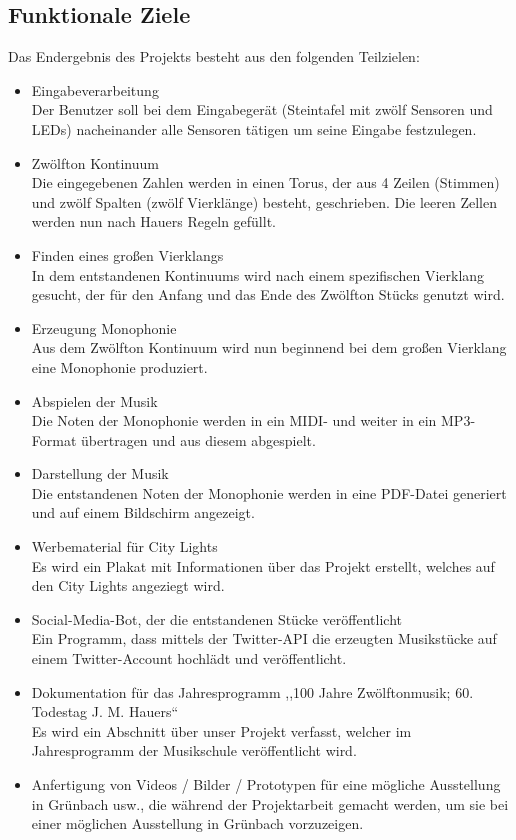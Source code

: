 \documentclass[a4paper]{scrartcl}
\begin{document}
\subsection{Funktionale Ziele}
Das Endergebnis des Projekts besteht aus den folgenden Teilzielen:
\begin{itemize}
	\item Eingabeverarbeitung\\
	Der Benutzer soll bei dem Eingabegerät (Steintafel mit zwölf Sensoren und LEDs) nacheinander alle Sensoren tätigen um seine Eingabe festzulegen.
	
	\item Zwölfton Kontinuum\\
	Die eingegebenen Zahlen werden in einen Torus, der aus 4 Zeilen (Stimmen) und zwölf Spalten (zwölf Vierklänge) besteht, geschrieben. Die leeren Zellen werden nun nach Hauers Regeln gefüllt.
	
	\item Finden eines großen Vierklangs\\
	In dem entstandenen Kontinuums wird nach einem spezifischen Vierklang gesucht, der für den Anfang und das Ende des Zwölfton Stücks genutzt wird.
	
	\item Erzeugung Monophonie\\
	Aus dem Zwölfton Kontinuum wird nun beginnend bei dem großen Vierklang eine Monophonie produziert.
	
	\item Abspielen der Musik\\
	Die Noten der Monophonie werden in ein MIDI- und weiter in ein MP3-Format übertragen und aus diesem abgespielt.
	
	\item Darstellung der Musik\\
	Die entstandenen Noten der Monophonie werden in eine PDF-Datei generiert und auf einem Bildschirm angezeigt.
	
	\item Werbematerial für City Lights\\
	Es wird ein Plakat mit Informationen über das Projekt erstellt, welches auf den City Lights angeziegt wird.
	
	\item Social-Media-Bot, der die entstandenen Stücke veröffentlicht\\
	Ein Programm, dass mittels der Twitter-API die erzeugten Musikstücke auf einem Twitter-Account
	hochlädt und veröffentlicht.
	
	\item Dokumentation für das Jahresprogramm ,,100 Jahre Zwölftonmusik; 60. Todestag J. M. Hauers``\\
	Es wird ein Abschnitt über unser Projekt verfasst, welcher im Jahresprogramm der Musikschule veröffentlicht wird.
	
	\item Anfertigung von Videos / Bilder / Prototypen für eine mögliche Ausstellung in Grünbach
	usw., die während der Projektarbeit gemacht werden, um sie bei einer möglichen Ausstellung in
	Grünbach vorzuzeigen.
\end{itemize}
\end{document}
